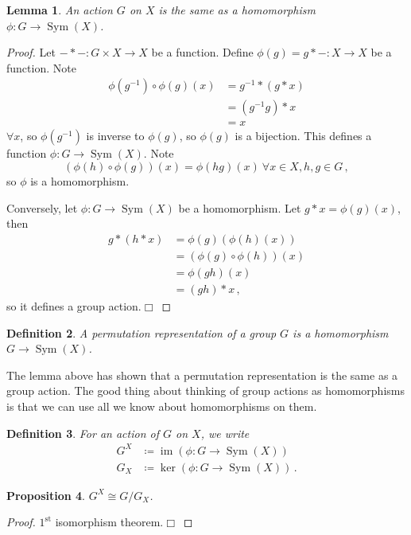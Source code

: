 \documentclass{article}
\theoremstyle{plain}\theoremheaderfont{\normalfont\itshape}\theorembodyfont{\rmfamily}\theoremseparator{.}\newtheorem*{rem}{Remark}\newtheorem*{ex}{Example}\newtheorem*{proof}{Proof}\newtheorem*{altp}{Alternative proof}\newtheorem*{nonex}{Non-Example}
\theoremstyle{plain}\theoremheaderfont{\normalfont\bfseries}\theorembodyfont{\rmfamily}\theoremseparator{.}\newtheorem{thm}{Theorem}[section]\newtheorem{lem}[thm]{Lemma}\newtheorem{prop}[thm]{Proposition}\newtheorem*{cor}{Corollary}\newtheorem{defn}[thm]{Definition}\newtheorem{clm}[thm]{Claim}\newtheorem{clminproof}{Claim}\newtheorem*{notn}{Notation}\newtheorem*{exer}{Exercise}\newtheorem*{lemnn}{Lemma}
\theoremstyle{break}\theoremheaderfont{\normalfont\itshape}\theorembodyfont{\rmfamily}\theoremseparator{.\medskip}\newtheorem*{proofskip}{Proof}\newtheorem*{exs}{Examples}\newtheorem*{rems}{Remarks}\newtheorem*{obs}{Observations}
\theoremstyle{break}\theoremheaderfont{\normalfont\bfseries}\theorembodyfont{\rmfamily}\theoremseparator{.\medskip}\newtheorem{lemskip}[thm]{Lemma}\newtheorem{defnskip}[thm]{Definition}\newtheorem{propskip}[thm]{Proposition}\newtheorem{thmskip}[thm]{Theorem}
\numberwithin{equation}{section}
\newcommand{\qed}{\hfill\ensuremath{\Box}}
\DeclareMathOperator*{\im}{im}
\DeclareMathOperator*{\Sym}{Sym}
\begin{document}
    \begin{lem}
        An action \(G\) on \(X\) is the same as a homomorphism \(\phi:G\to\Sym(X)\).
    \end{lem}
    \begin{proof}
        Let \(-*-:G\times X\to X\) be a function. Define \(\phi(g)=g*-:X\to X\) be a function. Note
        \begin{align*}
            \phi(g^{-1})\circ\phi(g)(x)&=g^{-1}*(g*x)\\
            &=(g^{-1}g)*x\\
            &=x
        \end{align*}
        \(\forall x\), so \(\phi(g^{-1})\) is inverse to \(\phi(g)\), so \(\phi(g)\) is a bijection. This defines a function \(\phi:G\to\Sym(X)\). Note
        \[(\phi(h)\circ\phi(g))(x)=\phi(hg)(x)\ \forall x\in X, h,g\in G\,,\]
        so \(\phi\) is a homomorphism.

        Conversely, let \(\phi:G\to\Sym(X)\) be a homomorphism. Let \(g*x=\phi(g)(x)\), then
        \begin{align*}
            g*(h*x)&=\phi(g)(\phi(h)(x))\\
            &=(\phi(g)\circ\phi(h))(x)\\
            &=\phi(gh)(x)\\
            &=(gh)*x\,,
        \end{align*}
        so it defines a group action.\qed
    \end{proof}
    \begin{defn}
        A permutation representation of a group \(G\) is a homomorphism \(G\to\Sym(X)\).
    \end{defn}
    The lemma above has shown that a permutation representation is the same as a group action. The good thing about thinking of group actions as homomorphisms is that we can use all we know about homomorphisms on them.
    \begin{defn}
        For an action of \(G\) on \(X\), we write
        \begin{align*}
            G^X&\coloneqq\im(\phi:G\to\Sym(X))\\
            G_X&\coloneqq\ker(\phi:G\to\Sym(X))\,.
        \end{align*}
    \end{defn}
    \begin{prop}
        \(G^X\cong G/G_X\).
    \end{prop}
    \begin{proof}
        \(1^{\text{st}}\) isomorphism theorem.\qed
    \end{proof}
\end{document}
